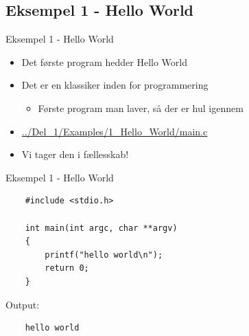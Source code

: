 \documentclass{beamer}
\begin{document}
\subsection{Eksempel 1 - Hello World}
\begin{frame}{Eksempel 1 - Hello World}
	\begin{itemize}
	\item{Det første program hedder Hello World}
	\item{Det er en klassiker inden for programmering}
		\begin{itemize}
		\item{Første program man laver, så der er hul igennem}
		\end{itemize}
	\item{\color{link}\href{https://github.com/Iakop/C-Programmering-for-begyndere/tree/master/Del_1/Examples/1_Hello_World/main.c}{../Del\_1/Examples/1\_Hello\_World/main.c}}
	\item{Vi tager den i fællesskab!}
	\end{itemize}
\end{frame}

\begin{frame}[fragile]{Eksempel 1 - Hello World}
	\begin{lstlisting}
	#include <stdio.h> 
	
	int main(int argc, char **argv)
	{
		printf("hello world\n");
		return 0;
	}
	\end{lstlisting}
	\begin{center}
	Output:
	\lstset{language=bash, numbers=none}
	\begin{lstlisting}
	hello world
	\end{lstlisting}
	\end{center}
\end{frame}

\end{document}
